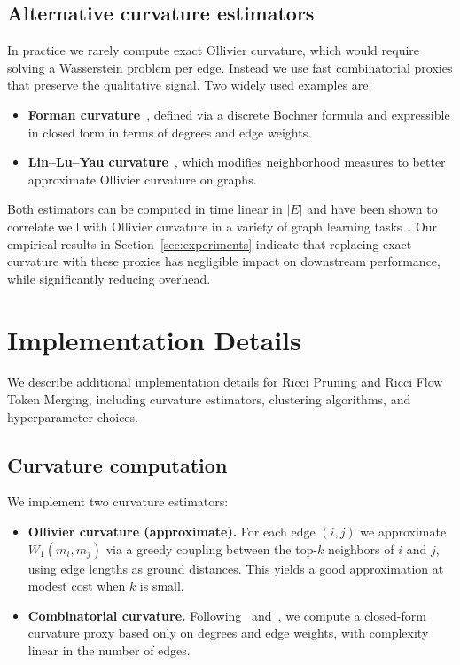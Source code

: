\documentclass{article}
\theoremstyle{plain}
\theoremstyle{definition}
\theoremstyle{remark}
\begin{document}
\subsection{Alternative curvature estimators}

In practice we rarely compute exact Ollivier curvature, which would require solving a Wasserstein problem per edge. Instead we use fast combinatorial proxies that preserve the qualitative signal. Two widely used examples are:
\begin{itemize}
  \item \textbf{Forman curvature}~\citep{forman2003bochner}, defined via a discrete Bochner formula and expressible in closed form in terms of degrees and edge weights.
  \item \textbf{Lin--Lu--Yau curvature}~\citep{lin2010ricci}, which modifies neighborhood measures to better approximate Ollivier curvature on graphs.
\end{itemize}
Both estimators can be computed in time linear in $|E|$ and have been shown to correlate well with Ollivier curvature in a variety of graph learning tasks~\citep{ni2019community,weber2024discrete,yadav2025roadmap}. Our empirical results in Section~\ref{sec:experiments} indicate that replacing exact curvature with these proxies has negligible impact on downstream performance, while significantly reducing overhead.

\section{Implementation Details}

\label{app:impl}

We describe additional implementation details for Ricci Pruning and Ricci Flow Token Merging, including curvature estimators, clustering algorithms, and hyperparameter choices.

\subsection{Curvature computation}

We implement two curvature estimators:

\begin{itemize}
  \item \textbf{Ollivier curvature (approximate).} For each edge $(i,j)$ we approximate $W_1(m_i,m_j)$ via a greedy coupling between the top-$k$ neighbors of $i$ and $j$, using edge lengths as ground distances. This yields a good approximation at modest cost when $k$ is small.
  \item \textbf{Combinatorial curvature.} Following~\citet{forman2003bochner} and~\citet{weber2024discrete}, we compute a closed-form curvature proxy based only on degrees and edge weights, with complexity linear in the number of edges.
\end{itemize}
\end{document}
